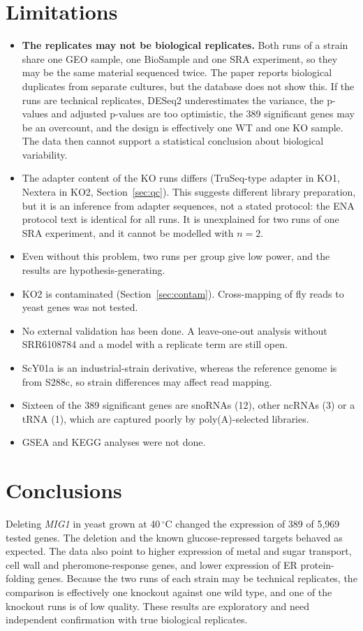 \documentclass[11pt, a4paper]{article}
\newcommand{\gene}[1]{\textit{#1}}
\newcommand{\degC}{\,$^\circ$C}
\begin{document}
\section{Limitations}\label{sec:limits}
\begin{itemize}
  \item \textbf{The replicates may not be biological replicates.} Both runs of a strain share one GEO sample, one BioSample and one SRA experiment, so they may be the same material sequenced twice. The paper reports biological duplicates from separate cultures, but the database does not show this. If the runs are technical replicates, DESeq2 underestimates the variance, the p-values and adjusted p-values are too optimistic, the 389 significant genes may be an overcount, and the design is effectively one WT and one KO sample. The data then cannot support a statistical conclusion about biological variability.
  \item The adapter content of the KO runs differs (TruSeq-type adapter in KO1, Nextera in KO2, Section~\ref{sec:qc}). This suggests different library preparation, but it is an inference from adapter sequences, not a stated protocol: the ENA protocol text is identical for all runs. It is unexplained for two runs of one SRA experiment, and it cannot be modelled with $n=2$.
  \item Even without this problem, two runs per group give low power, and the results are hypothesis-generating.
  \item KO2 is contaminated (Section~\ref{sec:contam}). Cross-mapping of fly reads to yeast genes was not tested.
  \item No external validation has been done. A leave-one-out analysis without SRR6108784 and a model with a replicate term are still open.
  \item ScY01a is an industrial-strain derivative, whereas the reference genome is from S288c, so strain differences may affect read mapping.
  \item Sixteen of the 389 significant genes are snoRNAs (12), other ncRNAs (3) or a tRNA (1), which are captured poorly by poly(A)-selected libraries.
  \item GSEA and KEGG analyses were not done.
\end{itemize}

\section{Conclusions}
Deleting \gene{MIG1} in yeast grown at 40\degC{} changed the expression of 389 of 5,969 tested genes. The deletion and the known glucose-repressed targets behaved as expected. The data also point to higher expression of metal and sugar transport, cell wall and pheromone-response genes, and lower expression of ER protein-folding genes. Because the two runs of each strain may be technical replicates, the comparison is effectively one knockout against one wild type, and one of the knockout runs is of low quality. These results are exploratory and need independent confirmation with true biological replicates.
\end{document}
